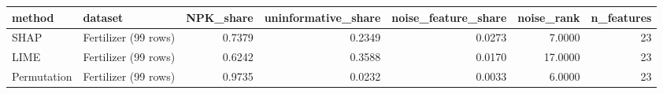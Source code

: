 \begin{tabular}{llrrrrr}
\toprule
method & dataset & NPK_share & uninformative_share & noise_feature_share & noise_rank & n_features \\
\midrule
SHAP & Fertilizer (99 rows) & 0.7379 & 0.2349 & 0.0273 & 7.0000 & 23 \\
LIME & Fertilizer (99 rows) & 0.6242 & 0.3588 & 0.0170 & 17.0000 & 23 \\
Permutation & Fertilizer (99 rows) & 0.9735 & 0.0232 & 0.0033 & 6.0000 & 23 \\
\bottomrule
\end{tabular}
